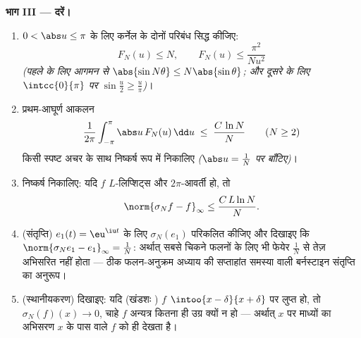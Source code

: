 \begin{problem}
\medskip
\noindent\textbf{भाग III --- दरें।}
\begin{enumerate}[resume]
  \item $0 < \abs u \leq
        \pi$ के लिए कर्नेल के दोनों परिबंध सिद्ध कीजिए:
        \[
        F_N(u) \leq N,
        \qquad
        F_N(u) \leq \frac{\pi^2}{N u^2}
        \]
        \emph{(पहले के लिए आगमन से $\abs{\sin N\theta} \leq
        N\abs{\sin\theta}$; और दूसरे के लिए $\intcc{0}{\pi}$ पर $\sin\frac u2 \geq \frac{u}{\pi}$)}।
  \item प्रथम-आघूर्ण आकलन
        \[
        \frac{1}{2\pi}\int_{-\pi}^{\pi}\abs u\,F_N(u)\,\dd u
        \;\leq\; \frac{C\,\ln N}{N}
        \qquad (N \geq 2)
        \]
        किसी स्पष्ट अचर के साथ निष्कर्ष रूप में निकालिए \emph{($\abs u =
        \frac1N$ पर
        बाँटिए)}।
  \item निष्कर्ष निकालिए: यदि $f$ $L$-लिप्शिट्स और $2\pi$-आवर्ती हो, तो
        \[
        \norm{\sigma_N f - f}_\infty \leq \frac{C\,L\ln N}{N} .
        \]
  \item (संतृप्ति) $e_1(t) =
        \eu^{\iu t}$ के लिए $\sigma_N(e_1)$ परिकलित कीजिए और दिखाइए कि $\norm{\sigma_Ne_1 - e_1}_\infty
        = \frac1N$:
        अर्थात् सबसे चिकने फलनों के लिए भी फेयेर $\frac1N$ से तेज़ अभिसरित नहीं
        होता --- ठीक फलन-अनुक्रम अध्याय की सप्ताहांत समस्या वाली
        बर्नस्टाइन संतृप्ति का अनुरूप।
  \item (स्थानीयकरण) दिखाइए: यदि (खंडशः ) $f$ $\intoo{x - \delta}{x + \delta}$ पर लुप्त हो, तो
        $\sigma_N(f)(x) \to 0$, चाहे $f$ अन्यत्र कितना ही उग्र क्यों न हो --- अर्थात् $x$
        पर माध्यों का अभिसरण $x$ के पास वाले $f$ को ही देखता है।
\end{enumerate}


\end{problem}
